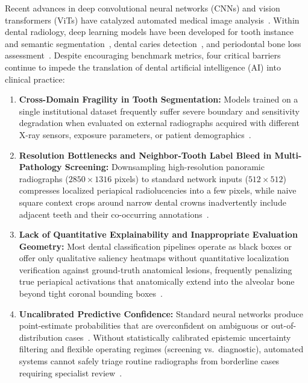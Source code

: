 \documentclass[review]{elsarticle}
\begin{document}
Recent advances in deep convolutional neural networks (CNNs) and vision transformers (ViTs) have catalyzed automated medical image analysis~\cite{esteva2017dermatologist, kermany2018identifying, le2022deep}. Within dental radiology, deep learning models have been developed for tooth instance and semantic segmentation~\cite{jader2018deep, chen2019tooth, silva2021automatic}, dental caries detection~\cite{lee2018caries, casalegno2019caries}, and periodontal bone loss assessment~\cite{krois2019deep}. Despite encouraging benchmark metrics, four critical barriers continue to impede the translation of dental artificial intelligence (AI) into clinical practice:
\begin{enumerate}
    \item \textbf{Cross-Domain Fragility in Tooth Segmentation:} Models trained on a single institutional dataset frequently suffer severe boundary and sensitivity degradation when evaluated on external radiographs acquired with different X-ray sensors, exposure parameters, or patient demographics~\cite{zech2018variable}.
    \item \textbf{Resolution Bottlenecks and Neighbor-Tooth Label Bleed in Multi-Pathology Screening:} Downsampling high-resolution panoramic radiographs ($2850 \times 1316$ pixels) to standard network inputs ($512 \times 512$) compresses localized periapical radiolucencies into a few pixels, while naive square context crops around narrow dental crowns inadvertently include adjacent teeth and their co-occurring annotations~\cite{hamamci2023dentex}.
    \item \textbf{Lack of Quantitative Explainability and Inappropriate Evaluation Geometry:} Most dental classification pipelines operate as black boxes or offer only qualitative saliency heatmaps without quantitative localization verification against ground-truth anatomical lesions, frequently penalizing true periapical activations that anatomically extend into the alveolar bone beyond tight coronal bounding boxes~\cite{begoli2019need, kelly2019key, tjoa2021survey}.
    \item \textbf{Uncalibrated Predictive Confidence:} Standard neural networks produce point-estimate probabilities that are overconfident on ambiguous or out-of-distribution cases~\cite{guo2017calibration}. Without statistically calibrated epistemic uncertainty filtering and flexible operating regimes (screening vs.\ diagnostic), automated systems cannot safely triage routine radiographs from borderline cases requiring specialist review~\cite{tonekaboni2019clinicians}.
\end{enumerate}
\end{document}
